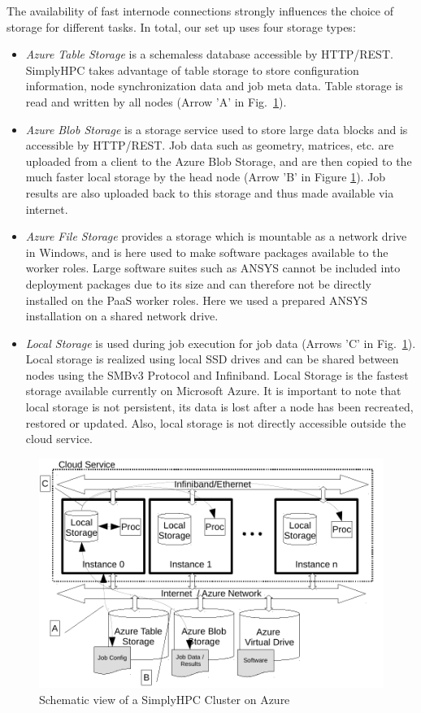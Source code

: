 \documentclass[3p,times]{elsarticle}
\begin{document}
The availability of fast internode connections strongly influences the choice of storage for different tasks. In total, our set up uses four storage types:
\begin{itemize}

	\item \textit{Azure Table Storage} is a schemaless database accessible by HTTP/REST. SimplyHPC takes advantage of table storage to store configuration information, node synchronization data and job meta data. Table storage is read and written by all nodes (Arrow 'A' in Fig.~\ref{fig:schemaService}).
	
	\item \textit{Azure Blob Storage} is a storage service used to store large data blocks and is accessible by HTTP/REST. Job data such as geometry, matrices, etc. are uploaded from a client to the Azure Blob Storage, and are then copied to the much faster local storage by the head node (Arrow 'B' in Figure \ref{fig:schemaService}). Job results are also uploaded back to this storage and thus made available via internet.	
	
	\item \textit{Azure File Storage} provides a storage which is mountable as a network drive in Windows, and is here used to make software packages available to the worker roles. Large software suites such as ANSYS cannot be included into deployment packages due to its size and can therefore not be directly installed on the PaaS worker roles. Here we used a prepared ANSYS installation on a shared network drive.
	
	\item \textit{Local Storage} is used during job execution for job data (Arrows 'C' in Fig.~\ref{fig:schemaService}). Local storage is realized using local SSD drives and can be shared between nodes using the SMBv3 Protocol and Infiniband. Local Storage is the fastest storage available currently on Microsoft Azure. It is important to note that local storage is not persistent, its data is lost after a node has been recreated, restored or updated. Also, local storage is not directly accessible outside the cloud service.

\end{itemize}


\begin{figure}[ht]
	\centering
	\includegraphics[width=.6\linewidth]{azureDeployment.pdf}

	\caption{Schematic view of a SimplyHPC Cluster on Azure}	
	\label{fig:schemaService}
\end{figure}
\end{document}
